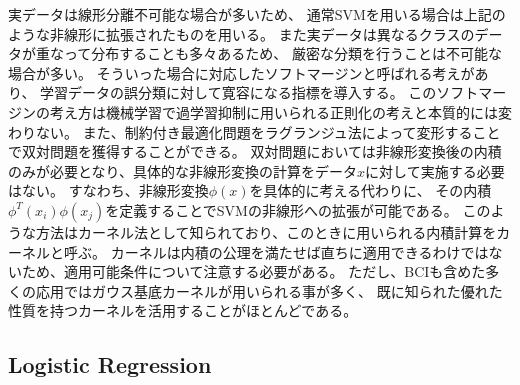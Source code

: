 実データは線形分離不可能な場合が多いため、
通常SVMを用いる場合は上記のような非線形に拡張されたものを用いる。
また実データは異なるクラスのデータが重なって分布することも多々あるため、
厳密な分類を行うことは不可能な場合が多い。
そういった場合に対応したソフトマージンと呼ばれる考えがあり、
学習データの誤分類に対して寛容になる指標を導入する。
このソフトマージンの考え方は機械学習で過学習抑制に用いられる正則化の考えと本質的には変わりない。
また、制約付き最適化問題をラグランジュ法によって変形することで双対問題を獲得することができる。
双対問題においては非線形変換後の内積のみが必要となり、具体的な非線形変換の計算をデータ\(x\)に対して実施する必要はない。
すなわち、非線形変換\(\phi(x)\)を具体的に考える代わりに、
その内積\(\phi^T(x_i)\phi(x_j)\)を定義することでSVMの非線形への拡張が可能である。
このような方法はカーネル法として知られており、このときに用いられる内積計算をカーネルと呼ぶ。
カーネルは内積の公理を満たせば直ちに適用できるわけではないため、適用可能条件について注意する必要がある。
ただし、BCIも含めた多くの応用ではガウス基底カーネルが用いられる事が多く、
既に知られた優れた性質を持つカーネルを活用することがほとんどである。

\subsection{Logistic Regression}
